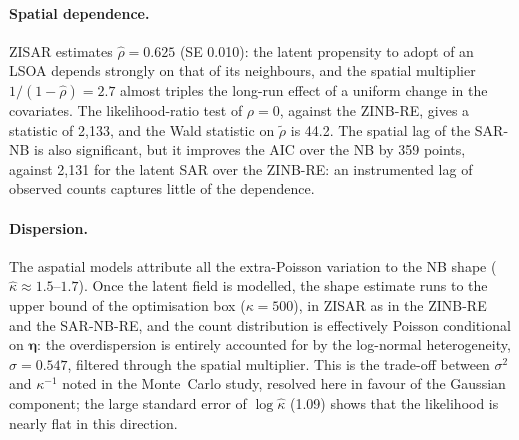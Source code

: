\paragraph{Spatial dependence.}
ZISAR estimates $\hat\rho = 0.625$ (SE 0.010): the latent propensity to adopt of an LSOA depends strongly on that of its neighbours, and the spatial multiplier $1/(1-\hat\rho) = 2.7$ almost triples the long-run effect of a uniform change in the covariates.
The likelihood-ratio test of $\rho = 0$, against the ZINB-RE, gives a statistic of 2{,}133, and the Wald statistic on $\tilde\rho$ is 44.2.
The spatial lag of the SAR-NB is also significant, but it improves the AIC over the NB by 359 points, against 2{,}131 for the latent SAR over the ZINB-RE: an instrumented lag of observed counts captures little of the dependence.

\paragraph{Dispersion.}
The aspatial models attribute all the extra-Poisson variation to the NB shape ($\hat\kappa\approx1.5$--$1.7$).
Once the latent field is modelled, the shape estimate runs to the upper bound of the optimisation box ($\kappa = 500$), in ZISAR as in the ZINB-RE and the SAR-NB-RE, and the count distribution is effectively Poisson conditional on $\boldsymbol\eta$: the overdispersion is entirely accounted for by the log-normal heterogeneity, $\hat\sigma = 0.547$, filtered through the spatial multiplier.
This is the trade-off between $\sigma^2$ and $\kappa^{-1}$ noted in the Monte~Carlo study, resolved here in favour of the Gaussian component; the large standard error of $\log\hat\kappa$ (1.09) shows that the likelihood is nearly flat in this direction.

